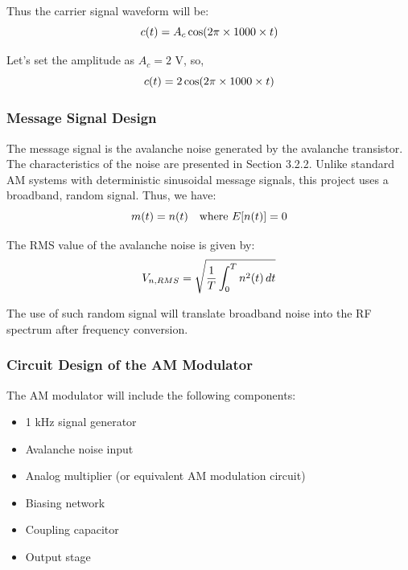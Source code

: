 \documentclass[12pt,a4paper]{report}
\begin{document}
	Thus the carrier signal waveform will be:
	\begingroup
	\setlength{\mathindent}{0pt}
	\begin{equation*}
		\hfill
		c(t) = A_c \cos(2\pi \times 1000 \times t)
		\hfill
	\end{equation*}
	\endgroup
	
	Let's set the amplitude as $A_c = 2$ V, so,
	\begingroup
	\setlength{\mathindent}{0pt}
	\begin{equation*}
		\hfill
		c(t) = 2 \cos(2\pi \times 1000 \times t)
		\hfill
	\end{equation*}
	\endgroup
	\subsubsection{Message Signal Design}
	The message signal is the avalanche noise generated by the avalanche transistor. The characteristics of the noise are presented in Section 3.2.2. Unlike standard AM systems with deterministic sinusoidal message signals, this project uses a broadband, random signal. Thus, we have:
	\begingroup
	\setlength{\mathindent}{0pt}
	\begin{equation*}
		\hfill
		m(t) = n(t) \quad \text{where } E[n(t)] = 0
		\hfill
	\end{equation*}
	\endgroup
	
	The RMS value of the avalanche noise is given by:
	\begingroup
	\setlength{\mathindent}{0pt}
	\begin{equation*}
		\hfill
		V_{n,RMS} = \sqrt{\frac{1}{T} \int_0^T n^2(t) \, dt}
		\hfill
	\end{equation*}
	\endgroup
	
	The use of such random signal will translate broadband noise into the RF spectrum after frequency conversion.
	\subsubsection{Circuit Design of the AM Modulator}
	The AM modulator will include the following components:
	\begin{itemize}
		\item 1 kHz signal generator
		\item Avalanche noise input
		\item Analog multiplier (or equivalent AM modulation circuit)
		\item Biasing network
		\item Coupling capacitor
		\item Output stage
	\end{itemize}
	
\end{document}
